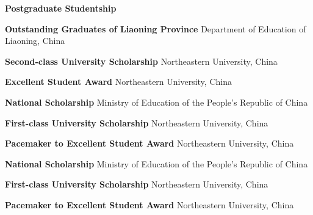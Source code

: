 %
%
%


\begin{scholarship}
	{\textbf{Postgraduate Studentship}}

	{\textbf{Outstanding Graduates of Liaoning Province}}
	\scholarshipentry{}
	{Department of Education of Liaoning, China}

	{\textbf{Second-class University Scholarship}}
	\scholarshipentry{}
	{Northeastern University, China}

	{\textbf{Excellent Student Award}}
	\scholarshipentry{}
	{Northeastern University, China}

	{\textbf{National Scholarship}}
	\scholarshipentry{}
	{Ministry of Education of the People's Republic of China}

	{\textbf{First-class University Scholarship}}
	\scholarshipentry{}
	{Northeastern University, China}

	{\textbf{Pacemaker to Excellent Student Award}}
	\scholarshipentry{}
	{Northeastern University, China}

	{\textbf{National Scholarship}}
	\scholarshipentry{}
	{Ministry of Education of the People's Republic of China}

	{\textbf{First-class University Scholarship}}
	\scholarshipentry{}
	{Northeastern University, China}

	{\textbf{Pacemaker to Excellent Student Award}}
	\scholarshipentry{}
	{Northeastern University, China}
\end{scholarship}